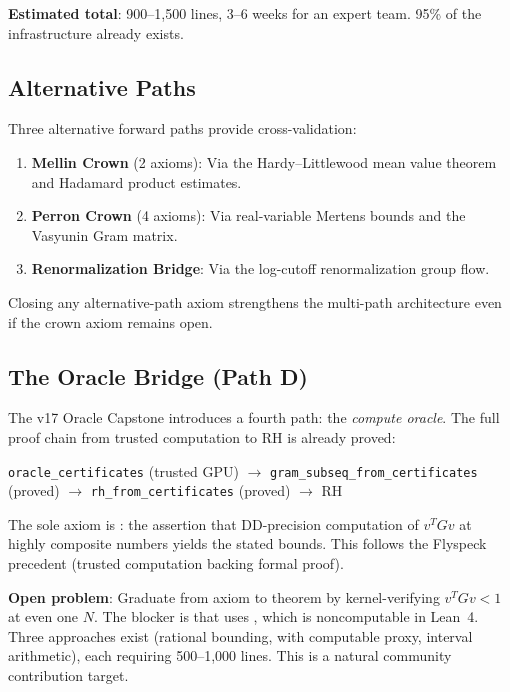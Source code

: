\documentclass[11pt,a4paper]{article}
\begin{document}
\textbf{Estimated total}: 900--1{,}500 lines, 3--6 weeks for an
expert team. 95\% of the infrastructure already exists.

\subsection{Alternative Paths}

Three alternative forward paths provide cross-validation:

\begin{enumerate}
  \item \textbf{Mellin Crown} (2 axioms): Via the Hardy--Littlewood
    mean value theorem and Hadamard product estimates.
  \item \textbf{Perron Crown} (4 axioms): Via real-variable Mertens
    bounds and the Vasyunin Gram matrix.
  \item \textbf{Renormalization Bridge}: Via the log-cutoff
    renormalization group flow.
\end{enumerate}

Closing any alternative-path axiom strengthens the multi-path
architecture even if the crown axiom remains open.

\subsection{The Oracle Bridge (Path D)}

The v17 Oracle Capstone introduces a fourth path: the
\emph{compute oracle}. The full proof chain from trusted computation
to RH is already proved:
\begin{center}
\small
\texttt{oracle\_certificates} (trusted GPU) $\to$
\texttt{gram\_subseq\_from\_certificates} (proved) $\to$
\texttt{rh\_from\_certificates} (proved) $\to$ RH
\end{center}
The sole axiom is : the assertion that
DD-precision computation of $v^T G v$ at highly composite numbers
yields the stated bounds. This follows the Flyspeck precedent
(trusted computation backing formal proof).

\textbf{Open problem}: Graduate  from
axiom to theorem by kernel-verifying $v^T G v < 1$ at even one $N$.
The blocker is that  uses ,
which is noncomputable in Lean~4. Three approaches exist (rational
bounding,  with computable proxy, interval
arithmetic), each requiring 500--1{,}000 lines. This is a natural
community contribution target.
\end{document}
